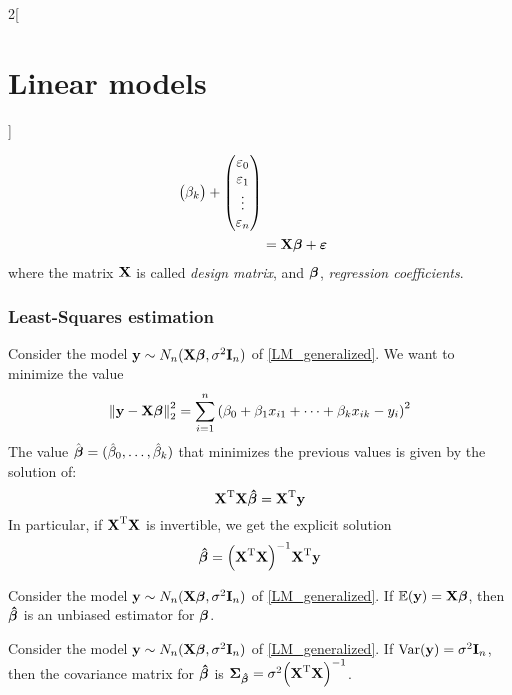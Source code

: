 \documentclass[../../../main_math.tex]{subfiles}
\begin{document}
\begin{multicols}{2}[\section{Linear models}]
\begin{definition}
\begin{align}
\begin{pmatrix}
                     \beta_k \\
                   \end{pmatrix}+
      \begin{pmatrix}
        \varepsilon_0 \\
        \varepsilon_1 \\
        \vdots        \\
        \varepsilon_n \\
      \end{pmatrix}                                                \\
      \label{LM_generalized}   & =\boldsymbol{\mathrm{X}}\boldsymbol{\mathrm{\beta}}+\boldsymbol{\mathrm{\varepsilon}}
    \end{align}
    where the matrix $\boldsymbol{\mathrm{X}}$ is called \emph{design matrix}, and $\boldsymbol{\mathrm{\beta}}$, \emph{regression coefficients}.
  \end{definition}
  \subsubsection{Least-Squares estimation}
  \begin{proposition}
    Consider the model $\boldsymbol{\mathrm{y}}\sim N_n(\boldsymbol{\mathrm{X\beta}},\sigma^2\boldsymbol{\mathrm{I}}_n)$ of \cref{LM_generalized}. We want to minimize the value $${\|\boldsymbol{\mathrm{y}}-\boldsymbol{\mathrm{X\beta}}\|}_2^2=\sum_{i=1}^n{\left(\beta_0+\beta_1x_{i1}+\cdots+\beta_kx_{ik}-y_i\right)}^2$$
    The value $\hat{\boldsymbol{\mathrm{\beta}}}=(\hat\beta_0,\ldots,\hat\beta_k)$ that minimizes the previous values is given by the solution of: $${\boldsymbol{\mathrm{X}}}^{\mathrm{T}}\boldsymbol{\mathrm{X\hat\beta}}={\boldsymbol{\mathrm{X}}}^{\mathrm{T}}\boldsymbol{\mathrm{y}}$$
    In particular, if ${\boldsymbol{\mathrm{X}}}^{\mathrm{T}}\boldsymbol{\mathrm{X}}$ is invertible, we get the explicit solution $$\boldsymbol{\mathrm{\hat\beta}}={\left({\boldsymbol{\mathrm{X}}}^{\mathrm{T}}\boldsymbol{\mathrm{X}}\right)}^{-1}{\boldsymbol{\mathrm{X}}}^{\mathrm{T}}\boldsymbol{\mathrm{y}}$$
  \end{proposition}
  \begin{proposition}
    Consider the model $\boldsymbol{\mathrm{y}}\sim N_n(\boldsymbol{\mathrm{X\beta}},\sigma^2\boldsymbol{\mathrm{I}}_n)$ of \cref{LM_generalized}. If $\mathbb{E}(\boldsymbol{\mathrm{y}})=\boldsymbol{\mathrm{X\beta}}$, then $\boldsymbol{\mathrm{\hat\beta}}$ is an unbiased estimator for $\boldsymbol{\mathrm{\beta}}$.
  \end{proposition}
  \begin{proposition}
    Consider the model $\boldsymbol{\mathrm{y}}\sim N_n(\boldsymbol{\mathrm{X\beta}},\sigma^2\boldsymbol{\mathrm{I}}_n)$ of \cref{LM_generalized}. If $\mathrm{Var}(\boldsymbol{\mathrm{y}})=\sigma^2\boldsymbol{\mathrm{I}}_n$, then the covariance matrix for $\boldsymbol{\mathrm{\hat\beta}}$ is $\boldsymbol{\mathrm{\Sigma}}_{\boldsymbol{\mathrm{\hat\beta}}}=\sigma^2{\left({\boldsymbol{\mathrm{X}}}^{\mathrm{T}}\boldsymbol{\mathrm{X}}\right)}^{-1}$.
  \end{proposition}

\end{multicols}
\end{document}
